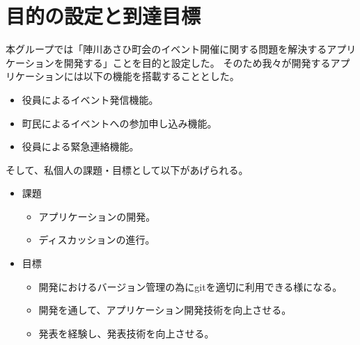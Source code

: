 \section{目的の設定と到達目標}
本グループでは「陣川あさひ町会のイベント開催に関する問題を解決するアプリケーションを開発する」ことを目的と設定した。
そのため我々が開発するアプリケーションには以下の機能を搭載することとした。
\begin{itemize}
    \item 役員によるイベント発信機能。
    \item 町民によるイベントへの参加申し込み機能。
    \item 役員による緊急連絡機能。
\end{itemize}
そして、私個人の課題・目標として以下があげられる。
\begin{itemize}
    \item 課題
    \begin{itemize}
        \item アプリケーションの開発。
        \item ディスカッションの進行。
    \end{itemize}

    \item 目標
    \begin{itemize}
        \item 開発におけるバージョン管理の為にgitを適切に利用できる様になる。
        \item 開発を通して、アプリケーション開発技術を向上させる。
        \item 発表を経験し、発表技術を向上させる。
    \end{itemize}
\end{itemize}
